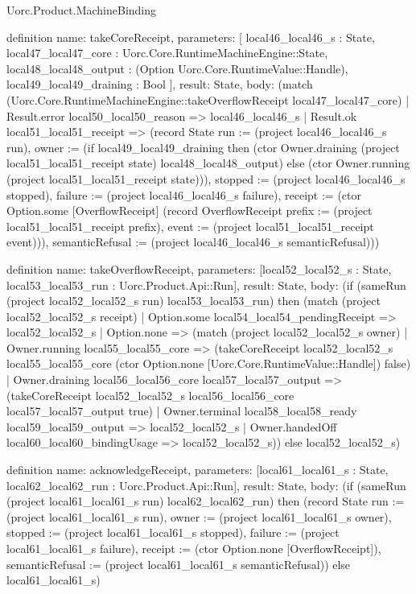 \begin{lexlean}{Uorc.Product.MachineBinding}
\begin{semanticmodule}
definition{
  name: takeCoreReceipt,
  parameters: [
    local46_local46_s : State,
    local47_local47_core : Uorc.Core.RuntimeMachineEngine::State,
    local48_local48_output : (Option Uorc.Core.RuntimeValue::Handle),
    local49_local49_draining : Bool
  ],
  result: State,
  body: (match (Uorc.Core.RuntimeMachineEngine::takeOverflowReceipt local47_local47_core)
    | Result.error local50_local50_reason => local46_local46_s
    | Result.ok local51_local51_receipt => (record State {run := (project local46_local46_s run), owner := (if local49_local49_draining then (ctor Owner.draining (project local51_local51_receipt state) local48_local48_output) else (ctor Owner.running (project local51_local51_receipt state))), stopped := (project local46_local46_s stopped), failure := (project local46_local46_s failure), receipt := (ctor Option.some [OverflowReceipt] (record OverflowReceipt {prefix := (project local51_local51_receipt prefix), event := (project local51_local51_receipt event)})), semanticRefusal := (project local46_local46_s semanticRefusal)}))
}

definition{
  name: takeOverflowReceipt,
  parameters: [local52_local52_s : State, local53_local53_run : Uorc.Product.Api::Run],
  result: State,
  body: (if (sameRun (project local52_local52_s run) local53_local53_run) then (match (project local52_local52_s receipt)
    | Option.some local54_local54_pendingReceipt => local52_local52_s
    | Option.none => (match (project local52_local52_s owner)
      | Owner.running local55_local55_core => (takeCoreReceipt local52_local52_s local55_local55_core (ctor Option.none [Uorc.Core.RuntimeValue::Handle]) false)
      | Owner.draining local56_local56_core local57_local57_output => (takeCoreReceipt local52_local52_s local56_local56_core local57_local57_output true)
      | Owner.terminal local58_local58_ready local59_local59_output => local52_local52_s
      | Owner.handedOff local60_local60_bindingUsage => local52_local52_s)) else local52_local52_s)
}

definition{
  name: acknowledgeReceipt,
  parameters: [local61_local61_s : State, local62_local62_run : Uorc.Product.Api::Run],
  result: State,
  body: (if (sameRun (project local61_local61_s run) local62_local62_run) then (record State {run := (project local61_local61_s run), owner := (project local61_local61_s owner), stopped := (project local61_local61_s stopped), failure := (project local61_local61_s failure), receipt := (ctor Option.none [OverflowReceipt]), semanticRefusal := (project local61_local61_s semanticRefusal)}) else local61_local61_s)
}


\end{semanticmodule}
\end{lexlean}
